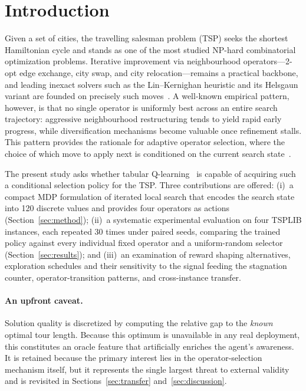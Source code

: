 \documentclass[10pt,twocolumn]{article}
\begin{document}
\section{Introduction}
Given a set of cities, the travelling salesman problem (TSP) seeks the
shortest Hamiltonian cycle and stands as one of the most studied NP-hard
combinatorial optimization problems. Iterative improvement via neighbourhood
operators---2-opt edge exchange, city swap, and city relocation---remains a
practical backbone, and leading inexact solvers such as the Lin--Kernighan
heuristic and its Helsgaun variant are founded on precisely such
moves~\cite{lin1973,helsgaun2000}. A well-known empirical pattern, however, is
that no single operator is uniformly best across an entire search trajectory:
aggressive neighbourhood restructuring tends to yield rapid early progress,
while diversification mechanisms become valuable once refinement stalls. This
pattern provides the rationale for adaptive operator selection, where the choice
of which move to apply next is conditioned on the current search
state~\cite{burke2013,meignan2010}.

The present study asks whether tabular Q-learning~\cite{watkins1992,sutton2018}
is capable of acquiring such a conditional selection policy for the TSP. Three
contributions are offered: (i)~a compact MDP formulation of iterated local
search that encodes the search state into 120 discrete values and provides four
operators as actions (Section~\ref{sec:method}); (ii)~a systematic experimental
evaluation on four TSPLIB instances, each repeated 30 times under paired seeds,
comparing the trained policy against every individual fixed operator and a
uniform-random selector (Section~\ref{sec:results}); and (iii)~an examination of
reward shaping alternatives, exploration schedules and their sensitivity to the
signal feeding the stagnation counter, operator-transition patterns, and
cross-instance transfer.

\paragraph{An upfront caveat.} Solution quality is discretized by computing the
relative gap to the \emph{known} optimal tour length. Because this optimum is
unavailable in any real deployment, this constitutes an oracle feature that
artificially enriches the agent's awareness. It is retained because the primary
interest lies in the operator-selection mechanism itself, but it represents the
single largest threat to external validity and is revisited in
Sections~\ref{sec:transfer} and~\ref{sec:discussion}.
\end{document}
